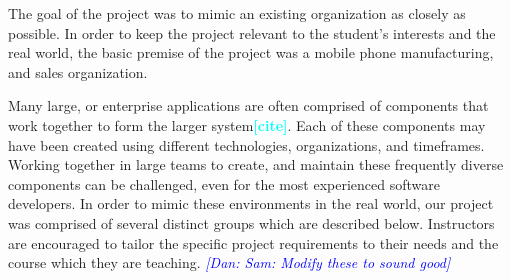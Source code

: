 \documentclass{sig-alternate-05-2015}
\newcommand{\todo}[1]{\textcolor{cyan}{\textbf{[#1]}}}
\newcommand{\dan}[1]{\textcolor{blue}{{\it [Dan: #1]}}}
\begin{document}



The goal of the project was to mimic an existing organization as closely as possible. In order to keep the project relevant to the student's interests and the real world, the basic premise of the project was a mobile phone manufacturing, and sales organization. 

Many large, or enterprise applications are often comprised of components that work together to form the larger system\todo{cite}. Each of these components may have been created using different technologies, organizations, and timeframes. Working together in large teams to create, and maintain these frequently diverse components can be challenged, even for the most experienced software developers. In order to mimic these environments in the real world, our project was comprised of several distinct groups which are described below. Instructors are encouraged to tailor the specific project requirements to their needs and the course which they are teaching. \dan{Sam: Modify these to sound good}
\end{document}
